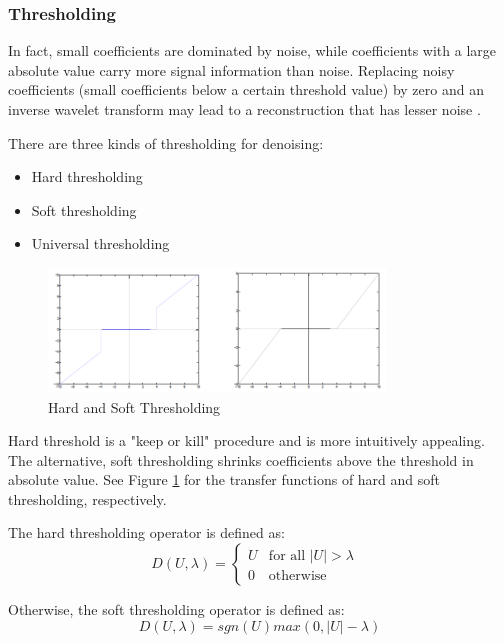 \subsubsection*{Thresholding}
In fact, small coefficients are dominated by noise, while coefficients with a large absolute value carry more signal information than noise. Replacing noisy coefficients (small coefficients below a certain threshold value) by zero and an inverse wavelet transform may lead to a reconstruction that has lesser noise \cite{rangarajan2002image}. 

There are three kinds of thresholding for denoising:
\begin{itemize}
	\item Hard thresholding
	\item Soft thresholding
	\item Universal thresholding
\end{itemize}

\begin{figure}[h]
	\centering
	\includegraphics[width=0.8\textwidth]{fig/hard_soft_thresholding}
	\caption{Hard and Soft Thresholding}
	\label{fig:hard_soft_thresholding}
\end{figure}

Hard threshold is a "keep or kill" procedure and
is more intuitively appealing. The alternative, soft
thresholding shrinks coefficients above the threshold in absolute value. See Figure \ref{fig:hard_soft_thresholding} for the transfer functions of hard and soft thresholding, respectively. 

The hard thresholding operator is defined as:
\begin{equation}
D(U, \lambda) = 
\begin{cases}
U &\text{for all $|U|>\lambda$ }\\
0 &\text{otherwise}
\end{cases}	
\end{equation}

Otherwise, the soft thresholding operator is defined as:
\begin{equation}
D(U, \lambda) = sgn(U)max(0, |U| - \lambda)
\end{equation}


